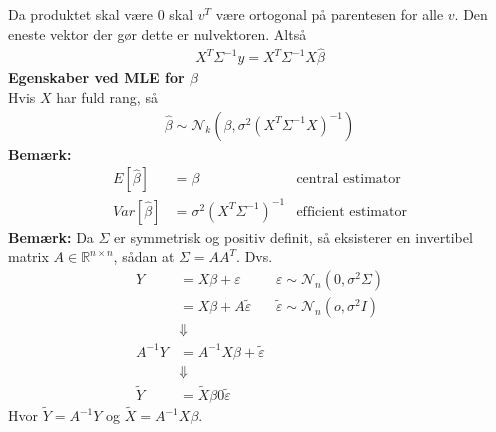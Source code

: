 \documentclass[12pt,a4paper]{report}
\begin{document}
Da produktet skal være 0 skal $v^T$ være ortogonal på parentesen for alle $v$. Den eneste vektor der gør dette er nulvektoren. Altså
\begin{align*}
X^T\Sigma^{-1}y=X^{T}\Sigma^{-1}X\hat{\beta}
\end{align*}
\textbf{Egenskaber ved MLE for $\beta$}\\
Hvis $X$ har fuld rang, så
\begin{align*}
\hat{\beta}\sim\mathcal{N}_k\left(\beta,\sigma^2\left(X^T\Sigma^{-1}X\right)^{-1}\right)
\end{align*}
\textbf{Bemærk:}
\begin{align*}
E[\hat{\beta}]&=\beta &\text{central estimator}\\
Var[\hat{\beta}]&=\sigma^2\left(X^T\Sigma^{-1}\right)^{-1} & \text{efficient estimator}
\end{align*}
\textbf{Bemærk:} Da $\Sigma$ er symmetrisk og positiv definit, så eksisterer en invertibel matrix $A\in\mathbb{R}^{n\times n}$, sådan at $\Sigma=AA^T$. Dvs.
\begin{align*}
Y&=X\beta+\varepsilon & \varepsilon\sim\mathcal{N}_n\left(0,\sigma^2\Sigma\right)\\
&=X\beta+A\tilde{\varepsilon} & \tilde{\varepsilon}\sim\mathcal{N}_n\left(o,\sigma^2I\right)\\
&\Downarrow\\
A^{-1}Y&=A^{-1}X\beta+\tilde{\varepsilon}\\
&\Downarrow\\
\tilde{Y}&=\tilde{X}\beta0\tilde{\varepsilon}
\end{align*}
Hvor $\tilde{Y}=A^{-1}Y$ og $\tilde{X}=A^{-1}X\beta$.
\end{document}
